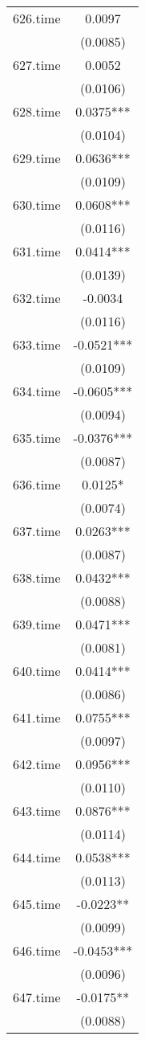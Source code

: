 \documentclass[]{article}
\begin{document}
\begin{tabular}{lc}
626.time & 0.0097 \\
 & (0.0085) \\
627.time & 0.0052 \\
 & (0.0106) \\
628.time & 0.0375*** \\
 & (0.0104) \\
629.time & 0.0636*** \\
 & (0.0109) \\
630.time & 0.0608*** \\
 & (0.0116) \\
631.time & 0.0414*** \\
 & (0.0139) \\
632.time & -0.0034 \\
 & (0.0116) \\
633.time & -0.0521*** \\
 & (0.0109) \\
634.time & -0.0605*** \\
 & (0.0094) \\
635.time & -0.0376*** \\
 & (0.0087) \\
636.time & 0.0125* \\
 & (0.0074) \\
637.time & 0.0263*** \\
 & (0.0087) \\
638.time & 0.0432*** \\
 & (0.0088) \\
639.time & 0.0471*** \\
 & (0.0081) \\
640.time & 0.0414*** \\
 & (0.0086) \\
641.time & 0.0755*** \\
 & (0.0097) \\
642.time & 0.0956*** \\
 & (0.0110) \\
643.time & 0.0876*** \\
 & (0.0114) \\
644.time & 0.0538*** \\
 & (0.0113) \\
645.time & -0.0223** \\
 & (0.0099) \\
646.time & -0.0453*** \\
 & (0.0096) \\
647.time & -0.0175** \\
 & (0.0088) \\

\end{tabular}
\end{document}
